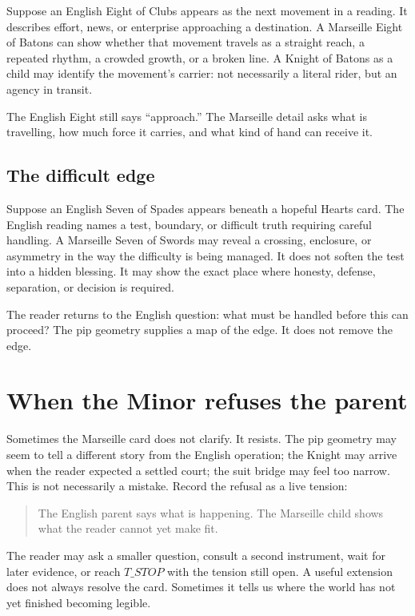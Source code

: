Suppose an English Eight of Clubs appears as the next movement in a reading. It
describes effort, news, or enterprise approaching a destination. A Marseille
Eight of Batons can show whether that movement travels as a straight reach, a
repeated rhythm, a crowded growth, or a broken line. A Knight of Batons as a
child may identify the movement's carrier: not necessarily a literal rider, but
an agency in transit.

The English Eight still says ``approach.'' The Marseille detail asks what is
travelling, how much force it carries, and what kind of hand can receive it.

\subsection{The difficult edge}

Suppose an English Seven of Spades appears beneath a hopeful Hearts card. The
English reading names a test, boundary, or difficult truth requiring careful
handling. A Marseille Seven of Swords may reveal a crossing, enclosure, or
asymmetry in the way the difficulty is being managed. It does not soften the
test into a hidden blessing. It may show the exact place where honesty, defense,
separation, or decision is required.

The reader returns to the English question: what must be handled before this
can proceed? The pip geometry supplies a map of the edge. It does not remove
the edge.

\section{When the Minor refuses the parent}

Sometimes the Marseille card does not clarify. It resists. The pip geometry may
seem to tell a different story from the English operation; the Knight may arrive
when the reader expected a settled court; the suit bridge may feel too narrow.
This is not necessarily a mistake. Record the refusal as a live tension:

\begin{quote}
The English parent says what is happening. The Marseille child shows what the
reader cannot yet make fit.
\end{quote}

The reader may ask a smaller question, consult a second instrument, wait for
later evidence, or reach $T\_STOP$ with the tension still open. A useful
extension does not always resolve the card. Sometimes it tells us where the
world has not yet finished becoming legible.
